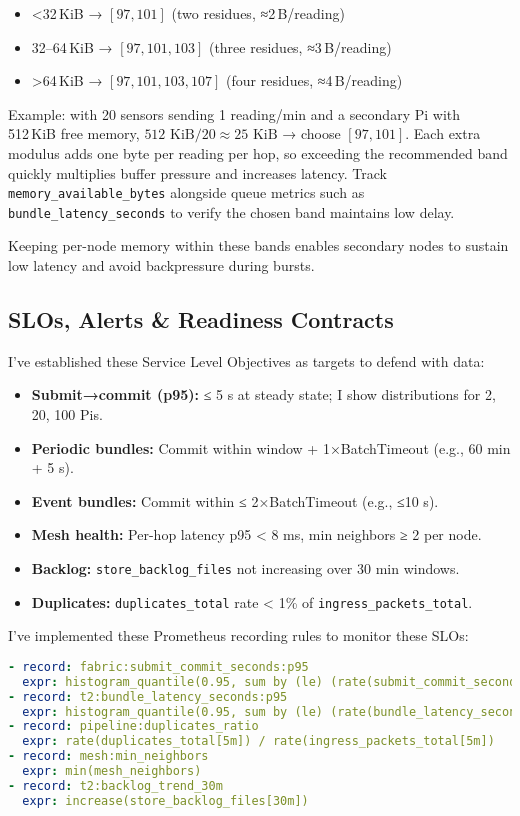 \documentclass[12pt]{article}
\begin{document}
\begin{itemize}
\item <32 KiB → \([97,101]\) (two residues, ≈2 B/reading)
\item 32–64 KiB → \([97,101,103]\) (three residues, ≈3 B/reading)
\item >64 KiB → \([97,101,103,107]\) (four residues, ≈4 B/reading)
\end{itemize}

Example: with 20 sensors sending 1 reading/min and a secondary Pi with 512 KiB
free memory, \(512 \text{ KiB} / 20 \approx 25 \text{ KiB}\) → choose \([97,101]\). Each extra modulus
adds one byte per reading per hop, so exceeding the recommended band quickly
multiplies buffer pressure and increases latency. Track \texttt{memory\_available\_bytes}
alongside queue metrics such as \texttt{bundle\_latency\_seconds} to verify the chosen
band maintains low delay.

Keeping per-node memory within these bands enables secondary nodes to sustain
low latency and avoid backpressure during bursts.

\subsection{SLOs, Alerts \& Readiness Contracts}

I've established these Service Level Objectives as targets to defend with data:

\begin{itemize}
\item \textbf{Submit→commit (p95):} ≤ 5 s at steady state; I show distributions for 2, 20, 100 Pis.
\item \textbf{Periodic bundles:} Commit within window + 1×BatchTimeout (e.g., 60 min + 5 s).
\item \textbf{Event bundles:} Commit within ≤ 2×BatchTimeout (e.g., ≤10 s).
\item \textbf{Mesh health:} Per-hop latency p95 < 8 ms, min neighbors ≥ 2 per node.
\item \textbf{Backlog:} \texttt{store\_backlog\_files} not increasing over 30 min windows.
\item \textbf{Duplicates:} \texttt{duplicates\_total} rate < 1\% of \texttt{ingress\_packets\_total}.
\end{itemize}

I've implemented these Prometheus recording rules to monitor these SLOs:

\begin{lstlisting}[language=yaml, basicstyle=\footnotesize\ttfamily]
- record: fabric:submit_commit_seconds:p95
  expr: histogram_quantile(0.95, sum by (le) (rate(submit_commit_seconds_bucket[5m])))
- record: t2:bundle_latency_seconds:p95
  expr: histogram_quantile(0.95, sum by (le) (rate(bundle_latency_seconds_bucket[5m])))
- record: pipeline:duplicates_ratio
  expr: rate(duplicates_total[5m]) / rate(ingress_packets_total[5m])
- record: mesh:min_neighbors
  expr: min(mesh_neighbors)
- record: t2:backlog_trend_30m
  expr: increase(store_backlog_files[30m])
\end{lstlisting}
\end{document}

